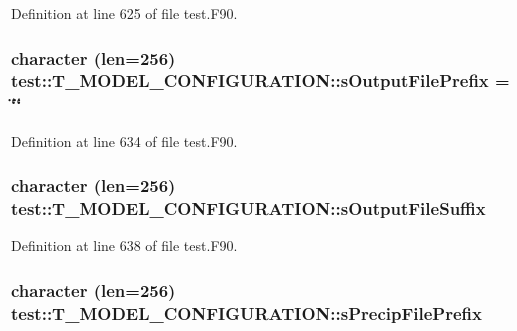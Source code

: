 Definition at line 625 of file test.F90.

\hypertarget{typetest_1_1_t___m_o_d_e_l___c_o_n_f_i_g_u_r_a_t_i_o_n_afea527ccbaadac205528a889e66778a9}{
\subsubsection[{sOutputFilePrefix}]{\setlength{\rightskip}{0pt plus 5cm}character (len=256) {\bf test::T\_\-MODEL\_\-CONFIGURATION::sOutputFilePrefix} = \char`\"{}\char`\"{}}}
\label{typetest_1_1_t___m_o_d_e_l___c_o_n_f_i_g_u_r_a_t_i_o_n_afea527ccbaadac205528a889e66778a9}


Definition at line 634 of file test.F90.

\hypertarget{typetest_1_1_t___m_o_d_e_l___c_o_n_f_i_g_u_r_a_t_i_o_n_a2f3357a8dfe3a7814732287636a8c5af}{
\subsubsection[{sOutputFileSuffix}]{\setlength{\rightskip}{0pt plus 5cm}character (len=256) {\bf test::T\_\-MODEL\_\-CONFIGURATION::sOutputFileSuffix}}}
\label{typetest_1_1_t___m_o_d_e_l___c_o_n_f_i_g_u_r_a_t_i_o_n_a2f3357a8dfe3a7814732287636a8c5af}


Definition at line 638 of file test.F90.

\hypertarget{typetest_1_1_t___m_o_d_e_l___c_o_n_f_i_g_u_r_a_t_i_o_n_a97a1395975346ce74d264c692e2c89b6}{
\subsubsection[{sPrecipFilePrefix}]{\setlength{\rightskip}{0pt plus 5cm}character (len=256) {\bf test::T\_\-MODEL\_\-CONFIGURATION::sPrecipFilePrefix}}}
\label{typetest_1_1_t___m_o_d_e_l___c_o_n_f_i_g_u_r_a_t_i_o_n_a97a1395975346ce74d264c692e2c89b6}



